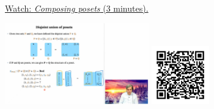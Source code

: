 
\begin{minipage}{10cm}
    \href{https://act4e-spring21.netlify.app/videos/spring2021-tradeoffs:tradeoffs:orders:composing-posets.html}{Watch: \emph{Composing posets} (3 minutes).}
        
    \href{https://act4e-spring21.netlify.app/videos/spring2021-tradeoffs:tradeoffs:orders:composing-posets.html}{\includegraphics[height=3.5cm]{spring2021-tradeoffs:tradeoffs:orders:composing-posets/thumbnails.jpg}}
    \href{https://act4e-spring21.netlify.app/videos/spring2021-tradeoffs:tradeoffs:orders:composing-posets.html}{\includegraphics[height=2.5cm]{spring2021-tradeoffs:tradeoffs:orders:composing-posets/qrcode.png}}
\end{minipage}
